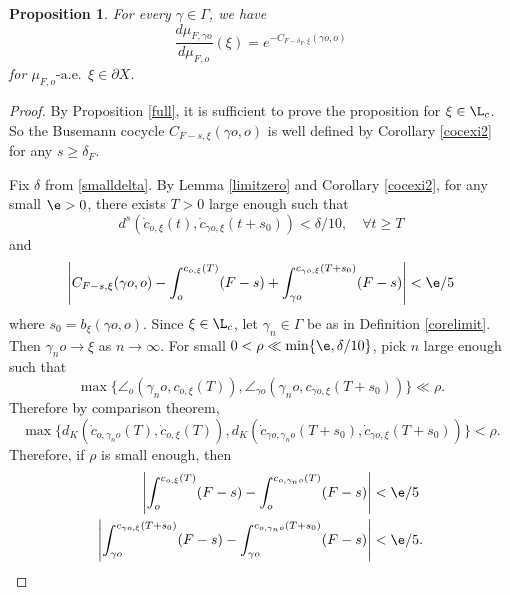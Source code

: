 \documentclass[11pt]{amsart}
\newtheorem{proposition}[theorem]{Proposition}
\theoremstyle{definition}
\def\pX{{\partial X}}
\def\c{\gamma}   \def\C{\Gamma}
\def\d{\delta}   %
\def\ae{\text{-a.e.}\ }
\begin{document}
\begin{proposition}\label{Busemann2}
For every $\c\in \C$, we have
$$\frac{d\mu_{F,\c o}}{d\mu_{F,o}}(\xi)=e^{-C_{F-\d_F, \xi}(\c o,o)}$$
for $\mu_{F,o} \ae\ \xi\in \pX$.
\end{proposition}
\begin{proof}
By Proposition \ref{full}, it is sufficient to prove the proposition for $\xi\in \L_c$. So the Busemann cocycle $C_{F-s, \xi}(\c o,o)$ is well defined by Corollary \ref{cocexi2} for any $s\ge \d_F$.

Fix $\d$ from \eqref{smalldelta}. By Lemma \ref{limitzero} and Corollary \ref{cocexi2}, for any small $\e>0$, there exists $T>0$ large enough such that 
$$d^s(\dot c_{o,\xi}(t), \dot c_{\c o,\xi}(t+s_0))<\d/10, \quad \forall t\ge T$$ 
and
\begin{equation}\label{e:est1}
\begin{aligned}
\left|C_{F-s,\xi}(\c o,o)-\int_{o}^{c_{o,\xi}(T)}(F-s)+\int_{\c o}^{c_{\c o,\xi}(T+s_0)}(F-s)\right|<\e/5
\end{aligned}
\end{equation}
where $s_0=b_\xi(\c o,o)$. Since $\xi\in \L_c$, let $\c_n\in \C$ be as in Definition \ref{corelimit}. Then $\c_n o\to \xi$ as $n\to \infty$. For small $0<\rho \ll \min\{\e, \d/10\}$, pick $n$ large enough such that 
$$\max\{\angle_o(\c_n o, c_{o,\xi}(T)), \angle_{\c o}(\c_n o, c_{\c o,\xi}(T+s_0))\}\ll \rho.$$
Therefore by comparison theorem,
$$\max\{d_K(\dot c_{o,\c_n o}(T), \dot c_{o,\xi}(T)), d_K(\dot c_{\c o,\c_n o}(T+s_0), \dot c_{\c o,\xi}(T+s_0))\}< \rho.$$
Therefore, if $\rho$ is small enough, then
\begin{equation}\label{e:est2}
\begin{aligned}
\left|\int_{o}^{c_{o,\xi}(T)}(F-s)-\int_{o}^{c_{o,\c_n o}(T)}(F-s)\right|&<\e/5\\
\left|\int_{\c o}^{c_{\c o,\xi}(T+s_0)}(F-s)-\int_{\c o}^{c_{o,\c_n o}(T+s_0)}(F-s)\right|&<\e/5.
\end{aligned}
\end{equation}


\end{proof}
\end{document}
